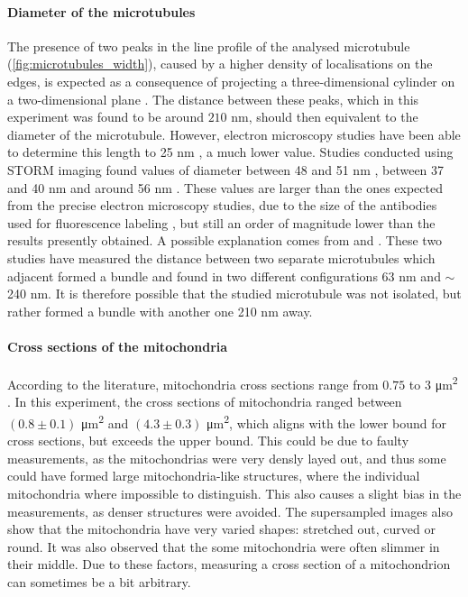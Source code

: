 \paragraph{Diameter of the microtubules}
The presence of two peaks in the line profile of the analysed microtubule (\autoref{fig:microtubules_width}), caused by a higher density of localisations on the edges, is expected as a consequence of projecting a three-dimensional cylinder on a two-dimensional plane \cite{douglass_notice_2023}.
The distance between these peaks, which in this experiment was found to be around $210$ nm, should then equivalent to the diameter of the microtubule.
However, electron microscopy studies have been able to determine this length to 25 nm \cite{moores_electron_2008}, a much lower value.
Studies conducted using STORM imaging found values of diameter between 48 and 51 nm \cite{bharadwaj_advancing_2024}, between 37 and 40 nm \cite{douglass_super-resolution_2016} and around 56 nm \cite{bates_multicolor_2007}.
These values are larger than the ones expected from the precise electron microscopy studies, due to the size of the antibodies used for fluorescence labeling \cite{douglass_notice_2023}, but still an order of magnitude lower than the results presently obtained.
A possible explanation comes from \cite{dong_stochastic_2015} and \cite{wang_blind_2017}.
These two studies have measured the distance between two separate microtubules which adjacent formed a bundle and found in two different configurations 63 nm and $\sim$240 nm.
It is therefore possible that the studied microtubule  was not isolated, but rather formed a bundle with another one 210 nm away.

\paragraph{Cross sections of the mitochondria}
According to the literature, mitochondria cross sections range from $0.75$ to $3$ \si{\micro\meter\squared} \cite{wiemerslage_quantification_2016}. In this experiment, the cross sections of mitochondria ranged between $(0.8 \pm 0.1)$ \unit{\micro\meter\squared} and $(4.3 \pm 0.3)$ \unit{\micro\meter\squared}, which aligns with the lower bound for cross sections, but exceeds the upper bound. This could be due to faulty measurements, as the mitochondrias were very densly layed out, and thus some could have formed large mitochondria-like structures, where the individual mitochondria where impossible to distinguish. This also causes a slight bias in the measurements, as denser structures were avoided. The supersampled images also show that the mitochondria have very varied shapes: stretched out, curved or round. It was also observed that the some mitochondria were often slimmer in their middle. Due to these factors, measuring a cross section of a mitochondrion can sometimes be a bit arbitrary.

